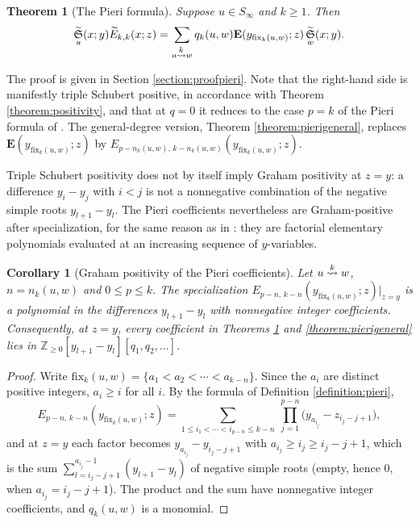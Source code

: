\documentclass{amsart}
\newtheorem{corollary}[lemma]{Corollary}
\newtheorem{theorem}[lemma]{Theorem}
\theoremstyle{definition}
\theoremstyle{remark}
\numberwithin{equation}{section}
\DeclareMathOperator{\qsch}{\widetilde{\mathfrak{S}}}
\newcommand{\xrightsquigarrow}[2][]{%
	\mathrel{\mathop{\rightsquigarrow}\limits^{\scriptstyle #2}%
	\ifx\hfuzz#1\hfuzz\else_{\scriptstyle #1}\fi}%
}
\newcommand{\tom}[1]{\ensuremath{\xrightsquigarrow{#1}}}
\newcommand{\fx}{\mathrm{fix}}
\newcommand{\wte}{\mathbf{E}}
\newcommand{\qelem}{\widetilde{E}}
\begin{document}
\begin{theorem}[The Pieri formula] \label{theorem:pieri}
Suppose $u\in S_\infty$ and $k\geq 1$. Then
$$\qsch_u(x;y)\qelem_{k,k}(x;z)=\sum_{u\tom{k} w}q_k(u,w)\wte(y_{\fx_{k}(u,w)};z)\qsch_w(x;y).$$
\end{theorem}

The proof is given in Section \ref{section:proofpieri}. Note that the right-hand side is manifestly triple Schubert positive, in accordance with Theorem \ref{theorem:positivity}, and that at $q=0$ it reduces to the case $p=k$ of the Pieri formula of \cite[Theorem~7.1]{samuelmolev}. The general-degree version, Theorem \ref{theorem:pierigeneral}, replaces $\wte(y_{\fx_k(u,w)};z)$ by $E_{p-n_k(u,w),\,k-n_k(u,w)}(y_{\fx_k(u,w)};z)$.

Triple Schubert positivity does not by itself imply Graham positivity at $z=y$: a difference $y_i-y_j$ with $i<j$ is not a nonnegative combination of the negative simple roots $y_{l+1}-y_l$. The Pieri coefficients nevertheless are Graham-positive after specialization, for the same reason as in \cite[Section~7]{samuelmolev}: they are factorial elementary polynomials evaluated at an increasing sequence of $y$-variables.

\begin{corollary}[Graham positivity of the Pieri coefficients] \label{corollary:pierigraham}
Let $u\tom{k}w$, $n=n_k(u,w)$ and $0\leq p\leq k$. The specialization $E_{p-n,\,k-n}(y_{\fx_k(u,w)};z)\big|_{z=y}$ is a polynomial in the differences $y_{l+1}-y_l$ with nonnegative integer coefficients. Consequently, at $z=y$, every coefficient in Theorems \ref{theorem:pieri} and \ref{theorem:pierigeneral} lies in $\mathbb Z_{\geq0}[y_{l+1}-y_l][q_1,q_2,\ldots]$.
\end{corollary}
\begin{proof}
Write $\fx_k(u,w)=\{a_1<a_2<\cdots<a_{k-n}\}$. Since the $a_i$ are distinct positive integers, $a_i\geq i$ for all $i$. By the formula of Definition \ref{definition:pieri},
$$E_{p-n,\,k-n}(y_{\fx_k(u,w)};z)=\sum_{1\leq i_1<\cdots<i_{p-n}\leq k-n}\ \prod_{j=1}^{p-n}\big(y_{a_{i_j}}-z_{i_j-j+1}\big),$$
and at $z=y$ each factor becomes $y_{a_{i_j}}-y_{i_j-j+1}$ with $a_{i_j}\geq i_j\geq i_j-j+1$, which is the sum $\sum_{l=i_j-j+1}^{a_{i_j}-1}(y_{l+1}-y_l)$ of negative simple roots (empty, hence $0$, when $a_{i_j}=i_j-j+1$). The product and the sum have nonnegative integer coefficients, and $q_k(u,w)$ is a monomial.
\end{proof}
\end{document}
